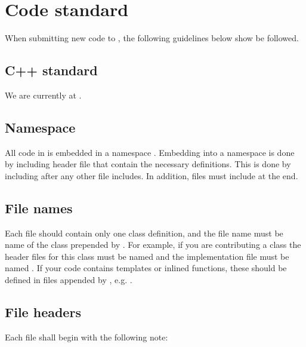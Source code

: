 \documentclass[letterpaper,10pt,english]{sphinxmanual}
\begin{document}
\sphinxstepscope


\section{Code standard}
\label{\detokenize{Contrib/CodeStandard:code-standard}}\label{\detokenize{Contrib/CodeStandard:chap-codestandard}}\label{\detokenize{Contrib/CodeStandard::doc}}
\sphinxAtStartPar
When submitting new code to , the following guidelines below show be followed.


\subsection{C++ standard}
\label{\detokenize{Contrib/CodeStandard:c-standard}}
\sphinxAtStartPar
We are currently at .


\subsection{Namespace}
\label{\detokenize{Contrib/CodeStandard:namespace}}
\sphinxAtStartPar
All code in  is embedded in a namespace .
Embedding into a namespace is done by including header file  that contain the necessary definitions.
This is done by including after any other file includes.
In addition, files must include  at the end.


\subsection{File names}
\label{\detokenize{Contrib/CodeStandard:file-names}}
\sphinxAtStartPar
Each file should contain only one class definition, and the file name must be name of the class prepended by .
For example, if you are contributing a class  the header files for this class must be named  and the implementation file must be named .
If your code contains templates or inlined functions, these should be defined in files appended by , e.g. .


\subsection{File headers}
\label{\detokenize{Contrib/CodeStandard:file-headers}}
\sphinxAtStartPar
Each file shall begin with the following note:
\end{document}
